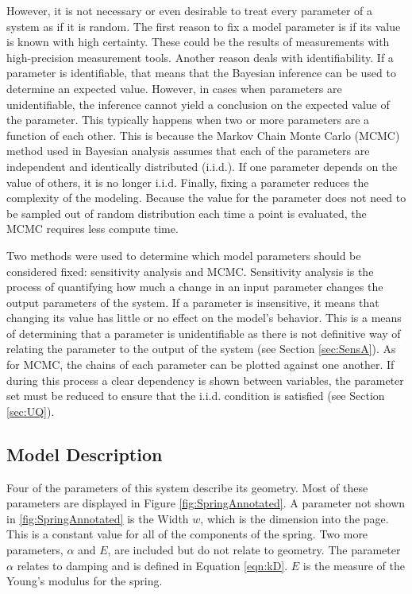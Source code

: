\documentclass[conference]{article}
\begin{document}
However, it is not necessary or even desirable to treat every parameter of a system as if it is random. The first reason to fix a model parameter is if its value is known with high certainty. These could be the results of measurements with high-precision measurement tools. Another reason deals with identifiability. If a parameter is identifiable, that means that the Bayesian inference can be used to determine an expected value. However, in cases when parameters are unidentifiable, the inference cannot yield a conclusion on the expected value of the parameter. This typically happens when two or more parameters are a function of each other. This is because the Markov Chain Monte Carlo (MCMC) method used in Bayesian analysis assumes that each of the parameters are independent and identically distributed (i.i.d.). If one parameter depends on the value of others, it is no longer i.i.d. Finally, fixing a parameter reduces the complexity of the modeling. Because the value for the parameter does not need to be sampled out of random distribution each time a point is evaluated, the MCMC requires less compute time. 

Two methods were used to determine which model parameters should be considered fixed: sensitivity analysis and MCMC. Sensitivity analysis is the process of quantifying how much a change in an input parameter changes the output parameters of the system. If a parameter is insensitive, it means that changing its value has little or no effect on the model's behavior. This is a means of determining that a parameter is unidentifiable as there is not definitive way of relating the parameter to the output of the system (see Section \ref{sec:SensA}). As for MCMC, the chains of each parameter can be plotted against one another. If during this process a clear dependency is shown between variables, the parameter set must be reduced to ensure that the i.i.d. condition is satisfied (see Section \ref{sec:UQ}).

\subsection{Model Description}

Four of the parameters of this system describe its geometry. Most of these parameters are displayed in Figure \ref{fig:SpringAnnotated}. A parameter not shown in \ref{fig:SpringAnnotated} is the Width $w$, which is the dimension into the page. This is a constant value for all of the components of the spring. Two more parameters, $\alpha$ and $E$, are included but do not relate to geometry. The parameter $\alpha$ relates to damping and is defined in Equation \ref{eqn:kD}. $E$ is the measure of the Young's modulus for the spring.
\end{document}
